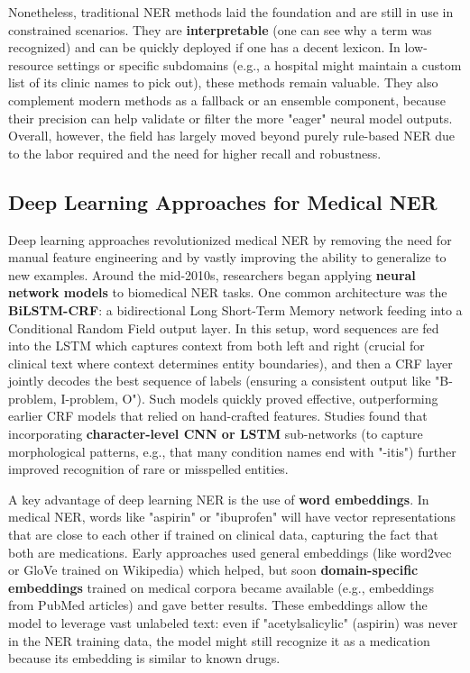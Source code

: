 Nonetheless, traditional NER methods laid the foundation and are still in use in constrained scenarios. They are \textbf{interpretable} (one can see why a term was recognized) and can be quickly deployed if one has a decent lexicon. In low-resource settings or specific subdomains (e.g., a hospital might maintain a custom list of its clinic names to pick out), these methods remain valuable. They also complement modern methods as a fallback or an ensemble component, because their precision can help validate or filter the more "eager" neural model outputs. Overall, however, the field has largely moved beyond purely rule-based NER due to the labor required and the need for higher recall and robustness.

\subsection{Deep Learning Approaches for Medical NER}

Deep learning approaches revolutionized medical NER by removing the need for manual feature engineering and by vastly improving the ability to generalize to new examples. Around the mid-2010s, researchers began applying \textbf{neural network models} to biomedical NER tasks. One common architecture was the \textbf{BiLSTM-CRF}: a bidirectional Long Short-Term Memory network feeding into a Conditional Random Field output layer. In this setup, word sequences are fed into the LSTM which captures context from both left and right (crucial for clinical text where context determines entity boundaries), and then a CRF layer jointly decodes the best sequence of labels (ensuring a consistent output like "B-problem, I-problem, O"). Such models quickly proved effective, outperforming earlier CRF models that relied on hand-crafted features. Studies found that incorporating \textbf{character-level CNN or LSTM} sub-networks (to capture morphological patterns, e.g., that many condition names end with "-itis") further improved recognition of rare or misspelled entities.

A key advantage of deep learning NER is the use of \textbf{word embeddings}. In medical NER, words like "aspirin" or "ibuprofen" will have vector representations that are close to each other if trained on clinical data, capturing the fact that both are medications. Early approaches used general embeddings (like word2vec or GloVe trained on Wikipedia) which helped, but soon \textbf{domain-specific embeddings} trained on medical corpora became available (e.g., embeddings from PubMed articles) and gave better results. These embeddings allow the model to leverage vast unlabeled text: even if "acetylsalicylic" (aspirin) was never in the NER training data, the model might still recognize it as a medication because its embedding is similar to known drugs.

